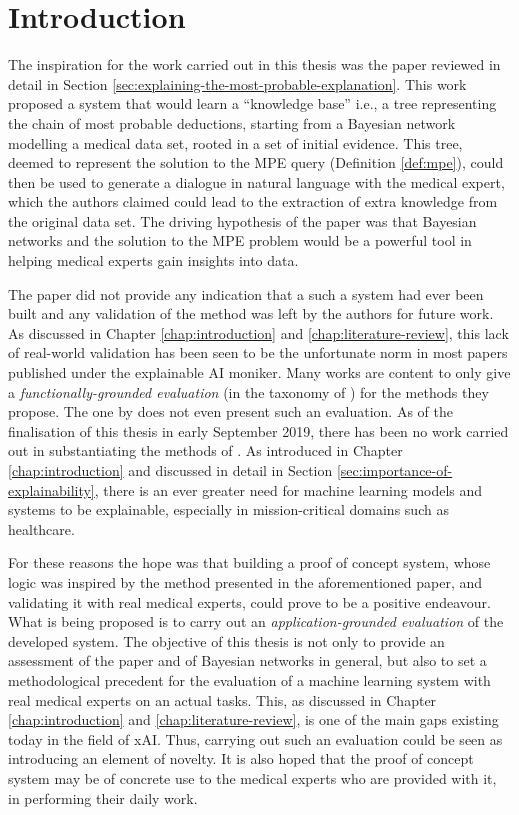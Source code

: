 \section{Introduction} \label{sec:methodology-introduction}
 The inspiration for the work carried out in this thesis was the paper \citep{Butz2018} reviewed in detail in Section \ref{sec:explaining-the-most-probable-explanation}.
 This work proposed a system that would learn a \enquote{knowledge base} i.e., a tree representing the chain of most probable deductions, starting from a Bayesian network modelling a medical data set, rooted in a set of initial evidence.
 This tree, deemed to represent the solution to the MPE query (Definition \ref{def:mpe}), could then be used to generate a dialogue in natural language with the medical expert, which the authors claimed could lead to the extraction of extra knowledge from the original data set.  
 The driving hypothesis of the paper was that Bayesian networks and the solution to the MPE problem would be a powerful tool in helping medical experts gain insights into data.
 
The paper did not provide any indication that a such a system had ever been built and any validation of the method was left by the authors for future work.
As discussed in Chapter \ref{chap:introduction} and \ref{chap:literature-review}, this lack of real-world validation has been seen to be the unfortunate norm in most papers published under the explainable AI moniker.
 Many works are content to only give a \textit{functionally-grounded evaluation} (in the taxonomy of \citet{doshi2017towards}) for the methods they propose.
The one by \citet{Butz2018} does not even present such an evaluation.
 As of the finalisation of this thesis in early September 2019, there has been no work carried out in substantiating the methods of \citet{Butz2018}.
 As introduced in Chapter \ref{chap:introduction} and discussed in detail in Section \ref{sec:importance-of-explainability}, there is an ever greater need for machine learning models and systems to be explainable, especially in mission-critical domains such as healthcare.
 
 For these reasons the hope was that building a proof of concept system, whose logic was inspired by the method presented in the aforementioned paper, and validating it with real medical experts, could prove to be a positive endeavour.
 What is being proposed is to carry out an \textit{application-grounded evaluation} of the developed system.
 The objective of this thesis is not only to provide an assessment of the paper and of Bayesian networks in general, but also to set a methodological precedent for the evaluation of a machine learning system with real medical experts on an actual tasks.
 This, as discussed in Chapter \ref{chap:introduction} and \ref{chap:literature-review}, is one of the main gaps existing today in the field of xAI.
 Thus, carrying out such an evaluation could be seen as introducing an element of novelty.
 It is also hoped that the proof of concept system may be of concrete use to the medical experts who are provided with it, in performing their daily work.

